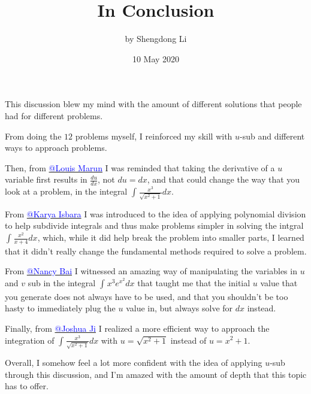 \documentclass[letterpaper, 12pt]{article}
\begin{document}
\title{In Conclusion}
\author{by Shengdong Li}
\date{10 May 2020}
\maketitle

This discussion blew my mind with the amount of different solutions that people had for different problems. \par 
From doing the $12$ problems myself, I reinforced my skill with $u$-sub and different ways to approach problems. \par
Then, from \href{https://bsd.instructure.com/groups/28355/users/33963}{\textcolor{blue}{@Louis Marun}} I was reminded that taking the derivative of a $u$ variable first results in $\frac{du}{dx}$, not $du=dx$, and that could change the way that you look at a problem, in the integral $\int_{ }^{ }\frac{x^{3}}{\sqrt{x^{2}+1}}dx$. \par
From \href{https://bsd.instructure.com/groups/28355/users/26747}{\textcolor{blue}{@Karya Isbara}} I was introduced to the idea of applying polynomial division to help subdivide integrals and thus make problems simpler in solving the intgral $\int_{ }^{ }\frac{x^{2}}{x+4}dx$, which, while it did help break the problem into smaller parts, I learned that it didn't really change the fundamental methods required to solve a problem. \par
From \href{https://bsd.instructure.com/groups/28355/users/51548}{\textcolor{blue}{@Nancy Bai}} I witnessed an amazing way of manipulating the variables in $u$ and $v$ sub in the integral $\int_{ }^{ }x^{3}e^{x^{2}}dx$ that taught me that the initial $u$ value that you generate does not always have to be used, and that you shouldn't be too hasty to immediately plug the $u$ value in, but always solve for $dx$ instead.\par
Finally, from \href{https://bsd.instructure.com/groups/28355/users/26476}{\textcolor{blue}{@Joshua Ji}} I realized a more efficient way to approach the integration of $\int_{ }^{ }\frac{x^{3}}{\sqrt{x^{2}+1}}dx$ with $u=\sqrt{x^{2}+1}$ instead of $u=x^{2}+1$.\par
Overall, I somehow feel a lot more confident with the idea of applying $u$-sub through this discussion, and I'm amazed with the amount of depth that this topic has to offer. 
\end{document}
